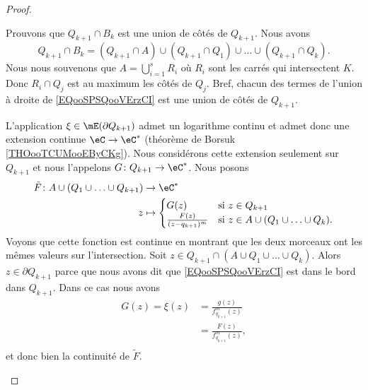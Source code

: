 \begin{proof}
\begin{subproof}
		Prouvons que \( Q_{k+1}\cap B_k\) est une union de côtés de \( Q_{k+1}\). Nous avons
		\begin{equation}        \label{EQooSPSQooVErzCI}
			Q_{k+1}\cap B_k=(Q_{k+1}\cap A)\cup(Q_{k+1}\cap Q_1)\cup\ldots\cup(Q_{k+1}\cap Q_k).
		\end{equation}
		Nous nous souvenons que \( A=\bigcup_{i=1}^sR_i\) où \( R_i\) sont les carrés qui intersectent \( K\). Donc \( R_i\cap Q_j\) est au maximum les côtés de \( Q_j\). Bref, chacun des termes de l'union à droite de \eqref{EQooSPSQooVErzCI} est une union de côtés de \( Q_{k+1}\).

		L'application \( \xi\in\mE(\partial Q_{k+1}) \) admet un logarithme continu et admet donc une extension continue \( \eC\to \eC^*\) (théorème de Borsuk \ref{THOooTCUMooEByCKg}). Nous considérons cette extension seulement sur \( Q_{k+1}\) et nous l'appelons \(G \colon Q_{k+1}\to \eC^*  \). Nous posons
		\begin{equation}
			\begin{aligned}
				\tilde F\colon A\cup(Q_1\cup\ldots \cup Q_{k+1}) & \to \eC^*                                                                                                                                                 \\
				z                                                & \mapsto\begin{cases}
					                                                          G(z)                         & \text{si } z\in Q_{k+1}                       \\
					                                                          \frac{F(z)}{(z-q_{k+1})^{m}} & \text{si } z\in A\cup(Q_1\cup\ldots\cup Q_k).
				                                                          \end{cases}
			\end{aligned}
		\end{equation}
		Voyons que cette fonction est continue en montrant que les deux morceaux ont les mêmes valeurs sur l'intersection. Soit \( z\in Q_{k+1}\cap(A\cup Q_1\cup\ldots\cup Q_k)\). Alors \( z\in \partial Q_{k+1}\) parce que nous avons dit que \eqref{EQooSPSQooVErzCI} est dans le bord dans \( Q_{k+1}\). Dans ce cas nous avons
		\begin{subequations}
			\begin{align}
				G(z)=\xi(z) & =\frac{ g(z) }{ f_{q_{k+1}}^{m}(z) } \\
				            & =\frac{F(z)}{f_{q_{k+1}}^{m}(z)},    \\
			\end{align}
		\end{subequations}
		et donc bien la continuité de \( \tilde F\).


\end{subproof}
\end{proof}

